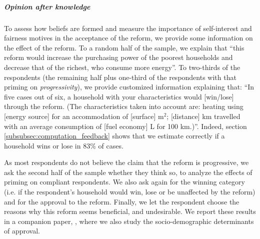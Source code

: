 \documentclass[12pt]{article} %
\begin{document}
\subparagraph{Opinion \emph{after knowledge}}
To assess how beliefs are formed and measure the importance of self-interest and fairness motives in the acceptance of the reform, we provide some information on the effect of the reform. To a random half of the sample, we explain that ``this reform would increase the purchasing power of the poorest households and decrease that of the richest, who consume more energy''. To two-thirds of the respondents (the remaining half plus one-third of the respondents with that priming on \emph{progressivity}), we provide customized information explaining that: ``In five cases out of six, a household with your characteristics would {[}win/lose{]} through the reform. (The characteristics taken into account are: heating using {[}energy source{]} for an accommodation of {[}surface{]} m$^{2}$; {[}distance{]} km travelled with an average consumption of {[}fuel economy{]} L for 100 km.)''. Indeed, section \ref{subsubsec:computation_feedback} shows that we estimate correctly if a household wins or lose in 83\% of cases. 

As most respondents do not believe the claim that the reform is progressive, we ask the second half of the sample whether they think so, to analyze the effects of priming on compliant respondents. We also ask again for the winning category (i.e. if the respondent's household would win, lose or be unaffected by the reform) and for the approval to the reform. Finally, we let the respondent choose the reasons why this reform seems beneficial, and undesirable. We report these results in a companion paper, \citet{douenne_french_2019}, where we also study the socio-demographic determinants of approval.
\end{document}
